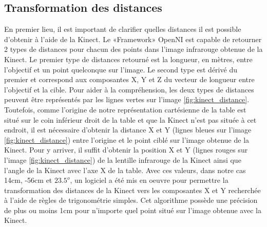 \subsection{Transformation des distances}
En premier lieu, il est important de clarifier quelles distances il est possible d'obtenir à l'aide de la Kinect. Le «Framework» OpenNI est capable de retourner 2 types de distances pour chacun des points dans l'image infrarouge obtenue de la Kinect. Le premier type de distances retourné est la longueur, en mètres, entre l'objectif et un point quelconque sur l'image. Le second type est dérivé du premier et correspond aux composantes X, Y et Z du vecteur de longueur entre l'objectif et la cible. Pour aider à la compréhension, les deux types de distances peuvent être représentés par les lignes vertes sur l'image \ref{fig:kinect_distance}. Toutefois, comme l'origine de notre représentation cartésienne de la table est situé sur le coin inférieur droit de la table et que la Kinect n'est pas située à cet endroit, il est nécessaire d'obtenir la distance X et Y (lignes bleues sur l'image \ref{fig:kinect_distance}) entre l'origine et le point ciblé sur l'image obtenue de la Kinect. Pour y arriver, il suffit d'obtenir la position X et Y (lignes rouges sur l'image \ref{fig:kinect_distance}) de la lentille infrarouge de la Kinect ainsi que l'angle de la Kinect avec l'axe X de la table. Avec ces valeurs, dans notre cas 14cm, -56cm et $23.5^o$, un logiciel a été mis en oeuvre pour permettre la transformation des distances de la Kinect vers les composantes X et Y recherchée à l'aide de règles de trigonométrie simples. Cet algorithme possède une précision de plus ou moins 1cm pour n'importe quel point situé sur l'image obtenue avec la Kinect. 

